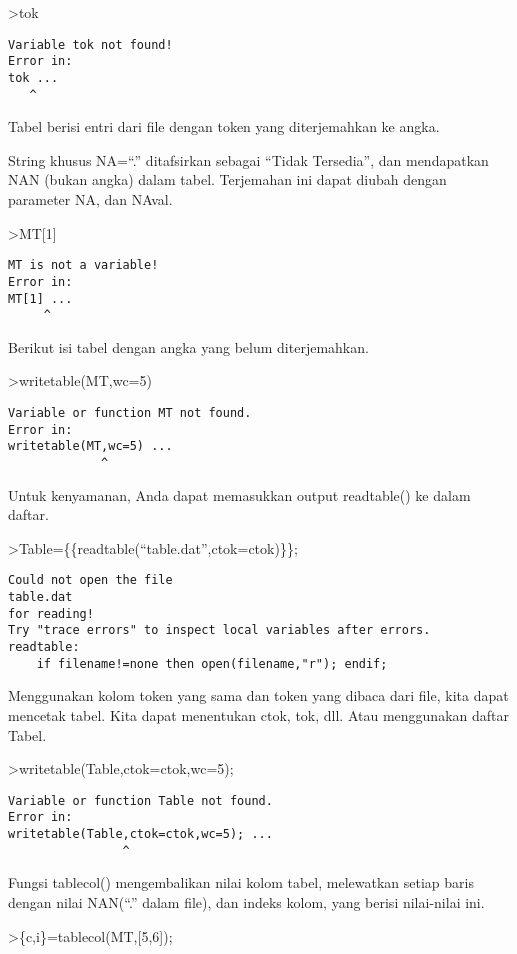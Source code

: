 \documentclass[
]{book}
\begin{document}
\textgreater tok

\begin{verbatim}
Variable tok not found!
Error in:
tok ...
   ^
\end{verbatim}

Tabel berisi entri dari file dengan token yang diterjemahkan ke angka.

String khusus NA=``.'' ditafsirkan sebagai ``Tidak Tersedia'', dan mendapatkan NAN (bukan angka) dalam tabel. Terjemahan ini dapat diubah dengan parameter NA, dan NAval.

\textgreater MT{[}1{]}

\begin{verbatim}
MT is not a variable!
Error in:
MT[1] ...
     ^
\end{verbatim}

Berikut isi tabel dengan angka yang belum diterjemahkan.

\textgreater writetable(MT,wc=5)

\begin{verbatim}
Variable or function MT not found.
Error in:
writetable(MT,wc=5) ...
             ^
\end{verbatim}

Untuk kenyamanan, Anda dapat memasukkan output readtable() ke dalam daftar.

\textgreater Table=\{\{readtable(``table.dat'',ctok=ctok)\}\};

\begin{verbatim}
Could not open the file
table.dat
for reading!
Try "trace errors" to inspect local variables after errors.
readtable:
    if filename!=none then open(filename,"r"); endif;
\end{verbatim}

Menggunakan kolom token yang sama dan token yang dibaca dari file, kita dapat mencetak tabel. Kita dapat menentukan ctok, tok, dll. Atau menggunakan daftar Tabel.

\textgreater writetable(Table,ctok=ctok,wc=5);

\begin{verbatim}
Variable or function Table not found.
Error in:
writetable(Table,ctok=ctok,wc=5); ...
                ^
\end{verbatim}

Fungsi tablecol() mengembalikan nilai kolom tabel, melewatkan setiap baris dengan nilai NAN(``.'' dalam file), dan indeks kolom, yang berisi nilai-nilai ini.

\textgreater\{c,i\}=tablecol(MT,{[}5,6{]});
\end{document}
